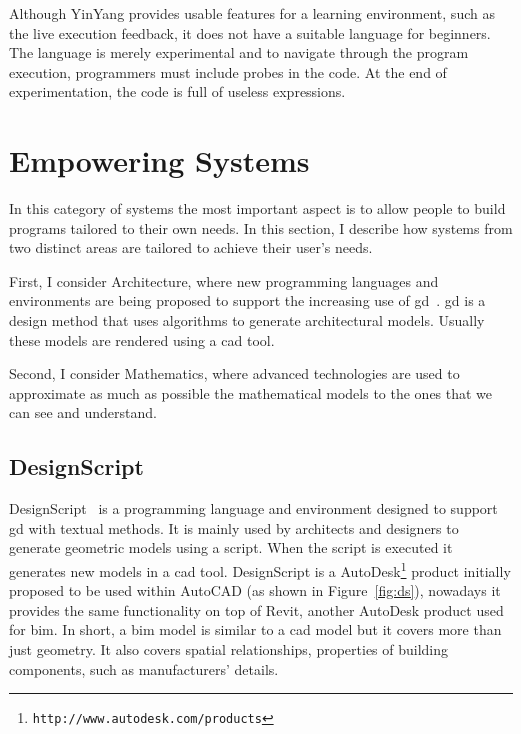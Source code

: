 Although YinYang provides usable features for a learning environment, such as the live execution feedback, it does not have a suitable language for beginners. The language is merely experimental and to navigate through the program execution, programmers must include probes in the code. At the end of experimentation, the code is full of useless expressions.

\section{Empowering Systems}
\label{sec:es}
In this category of systems the most important aspect is to allow people to build programs tailored to their own needs. In this section, I describe how systems from two distinct areas are tailored to achieve their user's needs. 

First, I consider Architecture, where new programming languages and environments are being proposed to support the increasing use of \gls{gd}~\citep{mccormack2004generative}. \gls{gd} is a design method that uses algorithms to generate architectural models. Usually these models are rendered using a \gls{cad} tool. 

Second, I consider Mathematics, where advanced technologies are used to approximate as much as possible the mathematical models to the ones that we can see and understand.

\subsection{DesignScript}
\label{subsec:designscript}
DesignScript~\citep{aish2012designscript} is a programming language and environment designed to support \gls{gd} with textual methods. It is mainly used by architects and designers to generate geometric models using a script. When the script is executed it generates new models in a \gls{cad} tool. DesignScript is a AutoDesk\footnote{\texttt{http://www.autodesk.com/products}} product initially proposed to be used within AutoCAD (as shown in Figure~\ref{fig:ds}), nowadays it provides the same functionality on top of Revit, another AutoDesk product used for \gls{bim}. In short, a \gls{bim} model is similar to a \gls{cad} model but it covers more than just geometry. It also covers spatial relationships, properties of building components, such as manufacturers' details.

